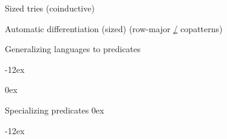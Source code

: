 \documentclass[aspectratio=169]{beamer}
\begin{document}
\rnc{}

\begin{frame}{Sized tries \hfill (coinductive)}
\vspace{-1.5ex}
\vspace{2ex}
\end{frame}

\begin{frame}{Automatic differentiation (sized) \hfill (row-major \hyperlink{automatic-diff}{/} copatterns)}
\vspace{-1.75ex}
\end{frame}


\rnc{}

\begin{comment}
\begin{frame}{Two kinds of language operations}
Codomain transformations: \AF{∅}, \AF 𝒰, \AF{\_∪\_}, \AF{\_∩\_}

Domain transformations: \AF{𝟏}, \AF{\_⋆\_}, \AF{\_☆}, \AF{`}
\end{frame}
\end{comment}

\begin{frame}{Generalizing languages to predicates}
\vspace{-1ex}
\begin{center}
\mathindent-12ex
\end{center}
\vspace{-2ex}
\hfill
\mathindent0ex
\small
\begin{minipage}[b]{20em}
\end{minipage}
\hfill
\begin{minipage}[b]{20em}
\end{minipage}
\hfill\;
\end{frame}

\begin{frame}{Specializing predicates}
\vspace{2ex}
\mathindent0ex
\begin{center}
\mathindent-12ex
\end{center}
\vspace{-2ex}
\hfill
\begin{minipage}[c]{11em}
\end{minipage}
\hfill
\begin{minipage}[c]{15em}
\end{minipage}
\hfill\;
\end{frame}
\end{document}
